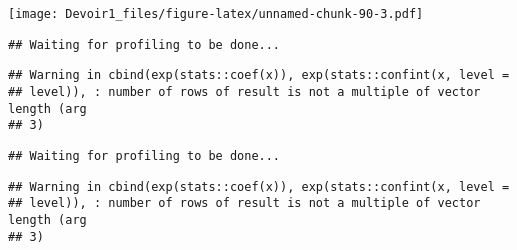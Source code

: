\documentclass[]{article}
\newenvironment{Shaded}{\begin{snugshade}}{\end{snugshade}}
\newcommand{\KeywordTok}[1]{\textcolor[rgb]{0.13,0.29,0.53}{\textbf{#1}}}
\newcommand{\DataTypeTok}[1]{\textcolor[rgb]{0.13,0.29,0.53}{#1}}
\newcommand{\DecValTok}[1]{\textcolor[rgb]{0.00,0.00,0.81}{#1}}
\newcommand{\StringTok}[1]{\textcolor[rgb]{0.31,0.60,0.02}{#1}}
\newcommand{\OperatorTok}[1]{\textcolor[rgb]{0.81,0.36,0.00}{\textbf{#1}}}
\newcommand{\NormalTok}[1]{#1}
\begin{document}
\texttt{[image: Devoir1\_files/figure-latex/unnamed-chunk-90-3.pdf]}

\begin{Shaded}
\end{Shaded}

\begin{verbatim}
## Waiting for profiling to be done...
\end{verbatim}

\begin{verbatim}
## Warning in cbind(exp(stats::coef(x)), exp(stats::confint(x, level =
## level)), : number of rows of result is not a multiple of vector length (arg
## 3)
\end{verbatim}

\begin{verbatim}
## Waiting for profiling to be done...
\end{verbatim}

\begin{verbatim}
## Warning in cbind(exp(stats::coef(x)), exp(stats::confint(x, level =
## level)), : number of rows of result is not a multiple of vector length (arg
## 3)
\end{verbatim}
\end{document}
